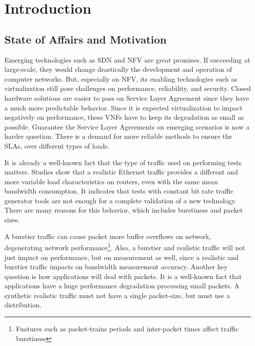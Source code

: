 \chapter{Introduction}\label{ch:introduction}

\section{State of Affairs and Motivation}\label{sec:state-of-the-art}
 

Emerging technologies such as SDN and NFV are great promises. If succeeding at large-scale, they would change drastically the development and operation of computer networks. But, especially on NFV, its enabling technologies such as virtualization still pose challenges on performance,  reliability, and security\cite{nfv-challenges}. Closed hardware solutions are easier to pass on Service Layer Agreement since they have a much more predictable behavior. Since it is expected virtualization to impact negatively on performance, these VNFs have to keep its degradation as small as possible. Guarantee the Service Layer Agreements on emerging scenarios is now a harder question. There is a demand for more reliable methods to ensure the SLAs, over different types of loads.


It is already a well-known fact that the type of traffic used on performing tests matters. Studies show that a realistic Ethernet traffic provides a different and more variable load characteristics on routers\cite{harpoon-validation}, even with the same mean bandwidth consumption. It indicates that tests with constant bit rate traffic generator tools are not enough for a complete validation of a new technology. There are many reasons for this behavior, which includes burstiness and packet sizes.


A burstier traffic can cause packet more buffer overflows on network\cite{burstiness-queue-lenght}\cite{modelling-of-self-similar}\cite{empirical-interarrival-study}, degenerating network performance\footnote{Fuatures such as packet-trains periods and inter-packet times affect traffic burstiness}. Also, a burstier and realistic traffic will not just impact on performance, but on measurement as well, since a realistic and burstier traffic impacts on bandwidth measurement accuracy\cite{legotg-paper}\cite{background-traffic-matter}. Another key question is how applications will deal with packets. It is a well-known fact that applications have a huge performance degradation processing small packets\cite{comparative-trafficgen-tools}. A synthetic realistic traffic must not have a single packet-size, but must use a distribution\cite{packet-distribution-model}. 


